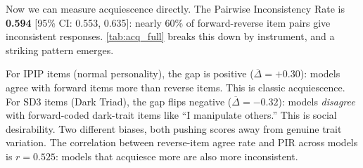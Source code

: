 \documentclass[11pt]{article}
\begin{document}
Now we can measure acquiescence directly. The Pairwise Inconsistency Rate is \textbf{0.594} [95\% CI: 0.553, 0.635]: nearly 60\% of forward-reverse item pairs give inconsistent responses. \cref{tab:acq_full} breaks this down by instrument, and a striking pattern emerges.

For IPIP items (normal personality), the gap is positive ($\overline{\Delta} = +0.30$): models agree with forward items more than reverse items. This is classic acquiescence. For SD3 items (Dark Triad), the gap flips negative ($\overline{\Delta} = -0.32$): models \emph{disagree} with forward-coded dark-trait items like ``I manipulate others.'' This is social desirability. Two different biases, both pushing scores away from genuine trait variation. The correlation between reverse-item agree rate and PIR across models is $r = 0.525$: models that acquiesce more are also more inconsistent.
\end{document}
